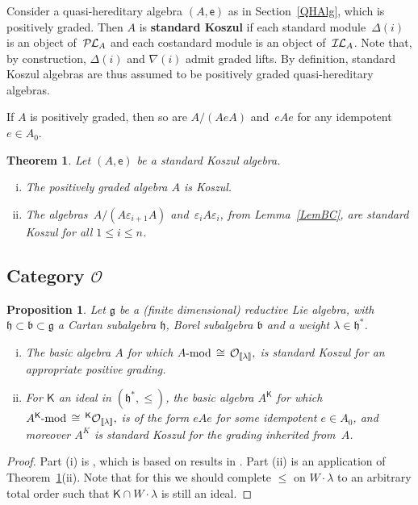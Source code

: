 \documentclass[11pt]{amsart}
\newcommand{\lbra}{[\![}
\newcommand{\rbra}{]\!]}
\newcommand{\PL}{\mathcal{P}\hspace{-0.15mm}\mathcal{L}}
\newcommand{\IL}{\mathcal{I}\hspace{-0.15mm}\mathcal{L}}
\newcommand{\KKK}{\mathsf{K}}
\newcommand{\cO}{\mathcal O}
\newcommand{\fg}{\mathfrak{g}}
\newcommand{\fh}{\mathfrak{h}}
\newcommand{\fb}{\mathfrak{b}}
\numberwithin{equation}{section}
\theoremstyle{plain}
\newtheorem{prop}[subsubsection]{Proposition}
\newtheorem{thm}[subsubsection]{Theorem}
\theoremstyle{remark}
\theoremstyle{remark}
\theoremstyle{construction}
\begin{document}
\subsubsection{} 
Consider a quasi-hereditary algebra $(A,\mathsf{e})$ as in Section~\ref{QHAlg}, which is positively graded. Then $A$ is {\bf standard Koszul} if
 each standard module~$\Delta(i)$ is {an object of}~$\PL_A$ and each costandard module is {an object of}~$\IL_A$.
Note that, by construction, $\Delta(i)$ and $\nabla(i)$ admit graded lifts. By definition, standard Koszul algebras are thus assumed to be positively graded quasi-hereditary algebras.




If $A$ is positively graded, then so are $A/(AeA)$ and~$eAe$ for any idempotent $e\in A_0$.


\begin{thm}\cite[Theorem~1.4 and Proposition~3.9]{ADL}\label{ThmADL}
Let $(A,\mathsf{e})$ be a standard Koszul algebra.
\begin{enumerate}[(i)]
\item The positively graded algebra $A$ is Koszul.
\item The algebras~$A/(A\varepsilon_{i+1}A)$ and~$\varepsilon_i A\varepsilon_i$, from Lemma~\ref{LemBC}, are standard Koszul for all $1\le i\le n$. 
\end{enumerate}
\end{thm}





\subsection{Category $\cO$}


\begin{prop}\cite{ADL}\label{PropOSK}
Let $\fg$ be a (finite dimensional) reductive Lie algebra, with $\fh\subset\fb\subset\fg$ a Cartan subalgebra $\fh$, Borel subalgebra $\fb$ and a weight $\lambda\in\fh^\ast$. 
\begin{enumerate}[(i)]
\item The basic algebra $A$ for which
$A\mbox{{\rm -mod}}\,\cong\,\cO_{\lbra\lambda\rbra},$
{is standard Koszul for an appropriate positive grading}.
\item For $\KKK$ an ideal in $(\fh^\ast,\le)$, the basic algebra $A^{\KKK}$ for which
$A^{\KKK}\mbox{{\rm -mod}}\,\cong\,{}^{\KKK}\cO_{\lbra\lambda\rbra},$  is of the form $eAe$ for some idempotent $e\in A_0$, {and moreover $A^K$} is standard Koszul for the grading inherited from~$A$.
\end{enumerate}
\end{prop}
\begin{proof}
Part (i) is \cite[Corollary~3.8]{ADL}, which is based on results in \cite{BGS}. Part (ii) is an application of Theorem~\ref{ThmADL}(ii). Note that for this we should complete $\le$ on $W\cdot\lambda$ to an arbitrary total order such that $\KKK\cap W\cdot\lambda$ is still an ideal.
\end{proof}
\end{document}
